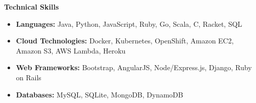 \documentclass{article}
\newcommand{\resheading}[1]{{\large \colorbox{mygrey}{\begin{minipage}{\textwidth}{\textbf{#1 \vphantom{p\^{E}}}}\end{minipage}}}}
\begin{document}
    \resheading{Technical Skills}

    \begin{itemize}
        \item {
        \textbf{Languages:}
        \vspace{-0.2cm}
        Java, Python, JavaScript, Ruby, Go, Scala, C, Racket, SQL
        }
        \item {
        \textbf{Cloud Technologies:}
        \vspace{-0.2cm}
        Docker, Kubernetes, OpenShift, Amazon EC2, Amazon S3, AWS Lambda, Heroku
        }
        \item {
        \textbf{Web Frameworks:}
        \vspace{-0.2cm}
        Bootstrap, AngularJS, Node/Express.js, Django, Ruby on Rails
        }
        \item {
        \textbf{Databases:}
        MySQL, SQLite, MongoDB, DynamoDB
        }
    \end{itemize}
\end{document}
